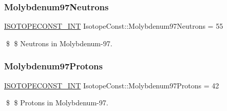 \subsubsection{\texorpdfstring{Molybdenum97\+Neutrons}{Molybdenum97Neutrons}}
{\footnotesize\ttfamily \mbox{\hyperlink{group___isotope_const-_macros_ga5f18360b3e99483a35c32d789e62621c}{I\+S\+O\+T\+O\+P\+E\+C\+O\+N\+S\+T\+\_\+\+I\+NT}} Isotope\+Const\+::\+Molybdenum97\+Neutrons = 55}

\$ \$ Neutrons in Molybdenum-\/97. \mbox{\label{group___isotope_const-_molybdenum-_mo97_ga3825096a1f967d51b974a0ddf04e6f70}} 
\subsubsection{\texorpdfstring{Molybdenum97\+Protons}{Molybdenum97Protons}}
{\footnotesize\ttfamily \mbox{\hyperlink{group___isotope_const-_macros_ga5f18360b3e99483a35c32d789e62621c}{I\+S\+O\+T\+O\+P\+E\+C\+O\+N\+S\+T\+\_\+\+I\+NT}} Isotope\+Const\+::\+Molybdenum97\+Protons = 42}

\$ \$ Protons in Molybdenum-\/97. 
